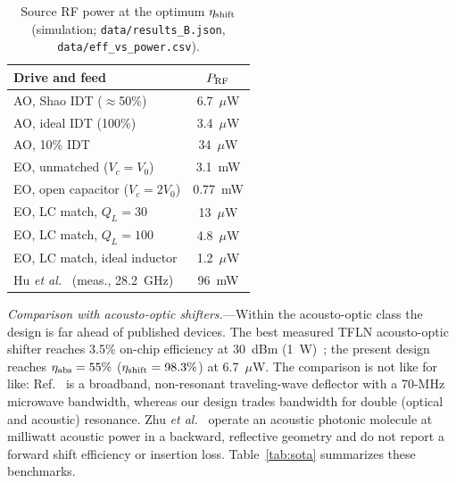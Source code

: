 \documentclass[aps,prapplied,reprint,superscriptaddress,amsmath,amssymb,floatfix]{revtex4-2}
\newcommand{\etash}{\eta_{\rm shift}}
\newcommand{\etaabs}{\eta_{\rm abs}}
\newcommand{\Pg}{P_{\rm RF}}
\begin{document}
\begin{table}[t]
\caption{Source RF power at the optimum $\etash$ (simulation; \texttt{data/results\_B.json}, \texttt{data/eff\_vs\_power.csv}).}
\label{tab:power}
\begin{ruledtabular}
\begin{tabular}{lc}
Drive and feed & $\Pg$\\
\hline
AO, Shao IDT ($\approx$50\%) & 6.7~$\mu$W\\
AO, ideal IDT (100\%) & 3.4~$\mu$W\\
AO, 10\% IDT & 34~$\mu$W\\
EO, unmatched ($V_c=V_0$) & 3.1~mW\\
EO, open capacitor ($V_c=2V_0$) & 0.77~mW\\
EO, LC match, $Q_L=30$ & 13~$\mu$W\\
EO, LC match, $Q_L=100$ & 4.8~$\mu$W\\
EO, LC match, ideal inductor & 1.2~$\mu$W\\
\hline
Hu \emph{et al.}~\cite{Hu2021} (meas., 28.2~GHz) & 96~mW\\
\end{tabular}
\end{ruledtabular}
\end{table}

\emph{Comparison with acousto-optic shifters.}---Within the acousto-optic class the design is far ahead of published devices. The best measured TFLN acousto-optic shifter reaches 3.5\% on-chip efficiency at 30~dBm (1~W)~\cite{Shao2020}; the present design reaches $\etaabs=55\%$ ($\etash=98.3\%$) at 6.7~$\mu$W. The comparison is not like for like: Ref.~\cite{Shao2020} is a broadband, non-resonant traveling-wave deflector with a 70-MHz microwave bandwidth, whereas our design trades bandwidth for double (optical and acoustic) resonance. Zhu \emph{et al.}~\cite{Zhu2025ao} operate an acoustic photonic molecule at milliwatt acoustic power in a backward, reflective geometry and do not report a forward shift efficiency or insertion loss. Table~\ref{tab:sota} summarizes these benchmarks.
\end{document}
